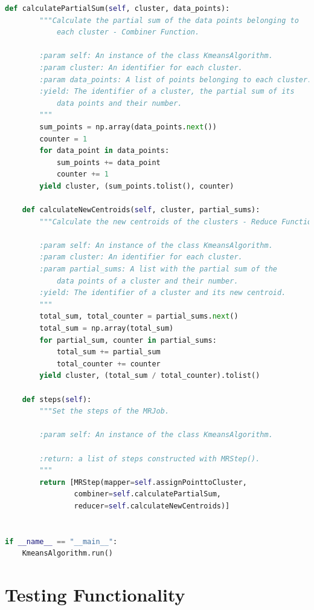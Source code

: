 \documentclass[11pt]{article}
\begin{document}
\begin{lstlisting}[language=Python]
    def calculatePartialSum(self, cluster, data_points):
        """Calculate the partial sum of the data points belonging to
            each cluster - Combiner Function.

        :param self: An instance of the class KmeansAlgorithm.
        :param cluster: An identifier for each cluster.
        :param data_points: A list of points belonging to each cluster.
        :yield: The identifier of a cluster, the partial sum of its
            data points and their number.
        """
        sum_points = np.array(data_points.next())
        counter = 1
        for data_point in data_points:
            sum_points += data_point
            counter += 1
        yield cluster, (sum_points.tolist(), counter)

    def calculateNewCentroids(self, cluster, partial_sums):
        """Calculate the new centroids of the clusters - Reduce Function.

        :param self: An instance of the class KmeansAlgorithm.
        :param cluster: An identifier for each cluster.
        :param partial_sums: A list with the partial sum of the
            data points of a cluster and their number.
        :yield: The identifier of a cluster and its new centroid.
        """
        total_sum, total_counter = partial_sums.next()
        total_sum = np.array(total_sum)
        for partial_sum, counter in partial_sums:
            total_sum += partial_sum
            total_counter += counter
        yield cluster, (total_sum / total_counter).tolist()

    def steps(self):
        """Set the steps of the MRJob.

        :param self: An instance of the class KmeansAlgorithm.

        :return: a list of steps constructed with MRStep().
        """
        return [MRStep(mapper=self.assignPointtoCluster,
                combiner=self.calculatePartialSum,
                reducer=self.calculateNewCentroids)]


if __name__ == "__main__":
    KmeansAlgorithm.run()

\end{lstlisting}


\section{Testing Functionality}\label{number-of-clusters}
\end{document}
